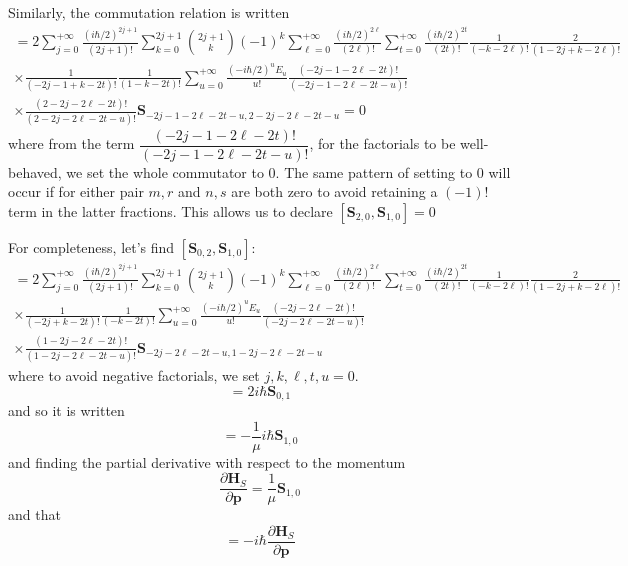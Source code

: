 \documentclass[a4paper]{article}
\theoremstyle{definition}
\begin{document}
Similarly, the commutation relation is written
\begin{multline}
	[\textbf{S}_{0,2},\textbf{S}_{0,1}]=2\sum_{j=0}^{+\infty}\frac{(i\hbar/2)^{2j+1}}{(2j+1)!}\sum_{k=0}^{2j+1}\binom{2j+1}{k}(-1)^k\sum_{\ell=0}^{+\infty}\frac{(i\hbar/2)^{2\ell}}{(2\ell)!}\sum_{t=0}^{+\infty}\frac{(i\hbar/2)^{2t}}{(2t)!}\frac{1}{(-k-2\ell)!}\frac{2}{(1-2j+k-2\ell)!}\\\times\frac{1}{(-2j-1+k-2t)!}\frac{1}{(1-k-2t)!}\sum_{u=0}^{+\infty}\frac{(-i\hbar/2)^uE_u}{u!}\frac{(-2j-1-2\ell-2t)!}{(-2j-1-2\ell-2t-u)!}\\\times\frac{(2-2j-2\ell-2t)!}{(2-2j-2\ell-2t-u)!}\textbf{S}_{-2j-1-2\ell-2t-u,2-2j-2\ell-2t-u}=0
\end{multline}
where from the term $\dfrac{(-2j-1-2\ell-2t)!}{(-2j-1-2\ell-2t-u)!}$, for the factorials to be well-behaved, we set the whole commutator to 0. The same pattern of setting to 0 will occur if for either pair $m,r$ and $n,s$ are both zero to avoid retaining a $(-1)!$ term in the latter fractions. This allows us to declare $[\textbf{S}_{2,0},\textbf{S}_{1,0}]=0$

For completeness, let's find $[\textbf{S}_{0,2},\textbf{S}_{1,0}]$:
\begin{multline}
	[\textbf{S}_{0,2},\textbf{S}_{1,0}]=2\sum_{j=0}^{+\infty}\frac{(i\hbar/2)^{2j+1}}{(2j+1)!}\sum_{k=0}^{2j+1}\binom{2j+1}{k}(-1)^k\sum_{\ell=0}^{+\infty}\frac{(i\hbar/2)^{2\ell}}{(2\ell)!}\sum_{t=0}^{+\infty}\frac{(i\hbar/2)^{2t}}{(2t)!}\frac{1}{(-k-2\ell)!}\frac{2}{(1-2j+k-2\ell)!}\\\times\frac{1}{(-2j+k-2t)!}\frac{1}{(-k-2t)!}\sum_{u=0}^{+\infty}\frac{(-i\hbar/2)^uE_u}{u!}\frac{(-2j-2\ell-2t)!}{(-2j-2\ell-2t-u)!}\\\times\frac{(1-2j-2\ell-2t)!}{(1-2j-2\ell-2t-u)!}\textbf{S}_{-2j-2\ell-2t-u,1-2j-2\ell-2t-u}
\end{multline}
where to avoid negative factorials, we set $j,k,\ell,t,u=0$.
\begin{equation}
	[\textbf{S}_{0,2},\textbf{S}_{1,0}]=2i\hbar\textbf{S}_{0,1}
\end{equation}
and so it is written
\begin{equation}
	[\textbf{H}_S,\textbf{S}_{0,1}]=-\frac{1}{\mu}i\hbar\textbf{S}_{1,0}
\end{equation}
and finding the partial derivative with respect to the momentum
\begin{equation}
	\frac{\partial\textbf{H}_S}{\partial\textbf{p}}=\frac{1}{\mu}\textbf{S}_{1,0}
\end{equation}
and that
\begin{equation}
	[\textbf{H}_S,\textbf{q}]=-i\hbar\frac{\partial\textbf{H}_S}{\partial\textbf{p}}
\end{equation}
\end{document}
